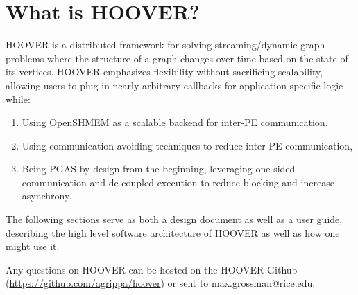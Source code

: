 \section{What is HOOVER?}

HOOVER is a distributed framework for solving streaming/dynamic graph problems
where the structure of a graph changes over time based on the state of its
vertices. HOOVER emphasizes flexibility without sacrificing scalability,
allowing users to plug in nearly-arbitrary callbacks for application-specific
logic while:

\begin{enumerate}
\item Using OpenSHMEM as a scalable backend for inter-PE communication.
\item Using communication-avoiding techniques to reduce inter-PE communication,
\item Being PGAS-by-design from the beginning, leveraging one-sided
communication and de-coupled execution to reduce blocking and increase
asynchrony.
\end{enumerate}

The following sections serve as both a design document as well as a user guide,
describing the high level software architecture of HOOVER as well as how one
might use it.

Any questions on HOOVER can be hosted on the HOOVER Github
(\url{https://github.com/agrippa/hoover}) or sent to max.grossman@rice.edu.
